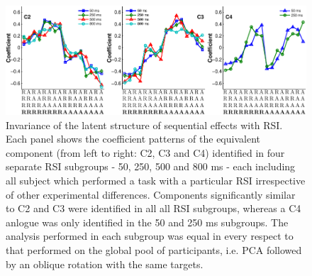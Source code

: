 \documentclass{apa}[12pt]
\begin{document}
\begin{figure}[t]
\centering
\includegraphics[width=1\textwidth]{components_rsi.pdf}
\caption[Invariance of the latent structure of sequential effects with RSI]{Invariance of the latent structure of sequential effects with RSI. Each panel shows the coefficient patterns of the equivalent component (from left to right: C2, C3 and C4) identified in four separate RSI subgroups - 50, 250, 500 and 800 ms - each including all subject which performed a task with a particular RSI irrespective of other experimental differences. Components significantly similar to C2 and C3 were identified in all all RSI subgroups, whereas a C4 anlogue was only identified in the 50 and 250 ms subgroups. The analysis performed in each subgroup was equal in every respect to that performed on the global pool of participants, i.e. PCA followed by an oblique rotation with the same targets. \label{components_rsi}}
\end{figure}
\end{document}
